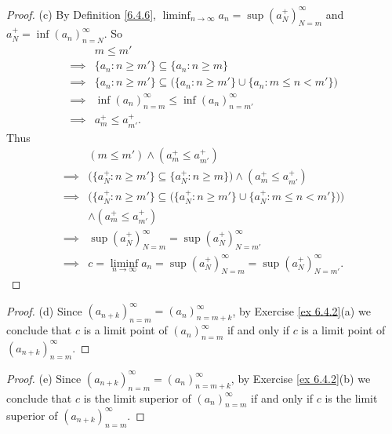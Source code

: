\begin{proof}{(c)}
    By Definition \ref{6.4.6}, \(\liminf_{n \to \infty} a_n = \sup(a_N^+)_{N = m}^\infty\) and \(a_N^+ = \inf(a_n)_{n = N}^\infty\).
    So
    \begin{align*}
                 & m \leq m'                                                                                \\
        \implies & \{a_n : n \geq m'\} \subseteq \{a_n : n \geq m\}                                         \\
        \implies & \{a_n : n \geq m'\} \subseteq \big(\{a_n : n \geq m'\} \cup \{a_n : m \leq n < m'\}\big) \\
        \implies & \inf(a_n)_{n = m}^\infty \leq \inf(a_n)_{n = m'}^\infty                                  \\
        \implies & a_m^+ \leq a_{m'}^+.
    \end{align*}
    Thus
    \begin{align*}
                 & (m \leq m') \land (a_m^+ \leq a_{m'}^+)                                                                    \\
        \implies & \big(\{a_N^+ : n \geq m'\} \subseteq \{a_N^+ : n \geq m\}\big) \land (a_m^+ \leq a_{m'}^+)                 \\
        \implies & \bigg(\{a_N^+ : n \geq m'\} \subseteq \big(\{a_N^+ : n \geq m'\} \cup \{a_N^+ : m \leq n < m'\}\big)\bigg) \\
                 & \land (a_m^+ \leq a_{m'}^+)                                                                                \\
        \implies & \sup(a_N^+)_{N = m}^\infty = \sup(a_N^+)_{N = m'}^\infty                                                   \\
        \implies & c = \liminf_{n \to \infty} a_n = \sup(a_N^+)_{N = m}^\infty = \sup(a_N^+)_{N = m'}^\infty.
    \end{align*}
\end{proof}

\begin{proof}{(d)}
    Since \((a_{n + k})_{n = m}^\infty = (a_n)_{n = m + k}^\infty\), by Exercise \ref{ex 6.4.2}(a) we conclude that \(c\) is a limit point of \((a_n)_{n = m}^\infty\) if and only if \(c\) is a limit point of \((a_{n + k})_{n = m}^\infty\).
\end{proof}

\begin{proof}{(e)}
    Since \((a_{n + k})_{n = m}^\infty = (a_n)_{n = m + k}^\infty\), by Exercise \ref{ex 6.4.2}(b) we conclude that \(c\) is the limit superior of \((a_n)_{n = m}^\infty\) if and only if \(c\) is the limit superior of \((a_{n + k})_{n = m}^\infty\).
\end{proof}

